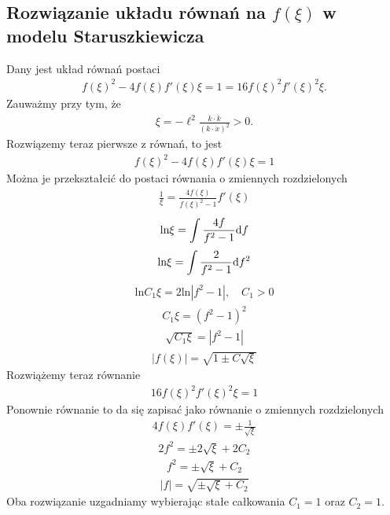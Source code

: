 \subsection{Rozwiązanie układu równań na $f(\xi)$  w modelu Staruszkiewicza}
\noindent
Dany jest układ równań postaci 
\begin{align*} 
 f(\xi)^2- 4 f(\xi) f'(\xi) \xi
 =  1 =
  16   f(\xi)^2 f'(\xi)^2 \xi .
\end{align*}
Zauważmy przy tym, że 
\begin{align*}
\xi = - \ell^2 \frac{\dot{k} \cdot \dot{k}}{ ( k \cdot \dot{x})^2 } > 0.
\end{align*}
Rozwiązemy teraz pierwsze z równań, to jest
\begin{align*} 
 f(\xi)^2- 4 f(\xi) f'(\xi) \xi =  1 
\end{align*}
Można je przekształcić do postaci równania o zmiennych 
rozdzielonych
\begin{align*} 
\frac{1}{\xi} = \frac{ 4 f(\xi) }{ f(\xi)^2-1} f'(\xi) 
\end{align*}
\begin{align*} 
\text{ln} \xi = \int \frac{ 4 f }{ f^2-1} \text{d} f 
\end{align*}
\begin{align*} 
\text{ln} \xi = \int \frac{ 2 }{ f^2-1} \text{d} f^2 
\end{align*}
\begin{align*} 
\text{ln} C_1 \xi = 2\text{ln}|f^2-1|, \quad C_1>0
\end{align*}
\begin{align*} 
 C_1 \xi  = (f^2-1)^2 
\end{align*}
\begin{align*} 
 \sqrt{ C_1 \xi}  = | f^2-1 | 
\end{align*}
\begin{align*} 
|f(\xi)| =  \sqrt{ 1 \pm C\sqrt{ \xi} } 
\end{align*}
Rozwiążemy teraz równanie
\begin{align*} 
  16   f(\xi)^2 f'(\xi)^2 \xi  = 1
\end{align*}
Ponownie równanie to da się zapisać jako równanie o 
zmiennych rozdzielonych
\begin{align*} 
  4  f(\xi) f'(\xi)   =\pm \frac{1}{\sqrt{\xi}}
\end{align*}
\begin{align*} 
  2 f^2   =\pm 2 \sqrt{\xi} + 2 C_2
\end{align*}
\begin{align*} 
   f^2   =\pm  \sqrt{\xi} + C_2
\end{align*}
\begin{align*} 
   |f|   =\sqrt{ \pm  \sqrt{\xi} + C_2 }
\end{align*}
Oba rozwiązanie uzgadniamy wybierając 
stałe całkowania $C_1 = 1$ oraz $C_2=1$.




